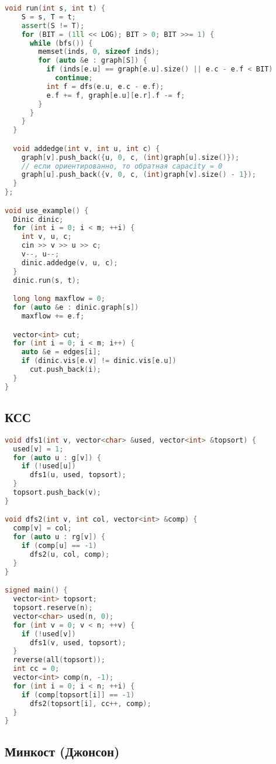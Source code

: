 \documentclass[9pt,a4paper,landscape,twosided]{extarticle}
\begin{document}
\begin{multicols*}{3}
\begin{lstlisting}[language=C++]
  void run(int s, int t) {
    S = s, T = t;
    assert(S != T);
    for (BIT = (1ll << LOG); BIT > 0; BIT >>= 1) {
      while (bfs()) {
        memset(inds, 0, sizeof inds);
        for (auto &e : graph[S]) {
          if (inds[e.u] == graph[e.u].size() || e.c - e.f < BIT)
            continue;
          int f = dfs(e.u, e.c - e.f);
          e.f += f, graph[e.u][e.r].f -= f;
        }
      }
    }
  }

  void addedge(int v, int u, int c) {
    graph[v].push_back({u, 0, c, (int)graph[u].size()});
    // если ориентированно, то обратная capacity = 0
    graph[u].push_back({v, 0, c, (int)graph[v].size() - 1});
  }
};

void use_example() {
  Dinic dinic;
  for (int i = 0; i < m; ++i) {
    int v, u, c;
    cin >> v >> u >> c;
    v--, u--;
    dinic.addedge(v, u, c);
  }
  dinic.run(s, t);

  long long maxflow = 0;
  for (auto &e : dinic.graph[s])
    maxflow += e.f;

  vector<int> cut;
  for (int i = 0; i < m; i++) {
    auto &e = edges[i];
    if (dinic.vis[e.v] != dinic.vis[e.u])
      cut.push_back(i);
  }
}
\end{lstlisting}

\subsection{КСС}
\begin{lstlisting}[language=C++]
void dfs1(int v, vector<char> &used, vector<int> &topsort) {
  used[v] = 1;
  for (auto u : g[v]) {
    if (!used[u])
      dfs1(u, used, topsort);
  }
  topsort.push_back(v);
}

void dfs2(int v, int col, vector<int> &comp) {
  comp[v] = col;
  for (auto u : rg[v]) {
    if (comp[u] == -1)
      dfs2(u, col, comp);
  }
}

signed main() {
  vector<int> topsort;
  topsort.reserve(n);
  vector<char> used(n, 0);
  for (int v = 0; v < n; ++v) {
    if (!used[v])
      dfs1(v, used, topsort);
  }
  reverse(all(topsort));
  int cc = 0;
  vector<int> comp(n, -1);
  for (int i = 0; i < n; ++i) {
    if (comp[topsort[i]] == -1)
      dfs2(topsort[i], cc++, comp);
  }
}
\end{lstlisting}

\subsection{Минкост (Джонсон)}
\begin{lstlisting}[language=C++]


\end{lstlisting}
\end{multicols*}
\end{document}
